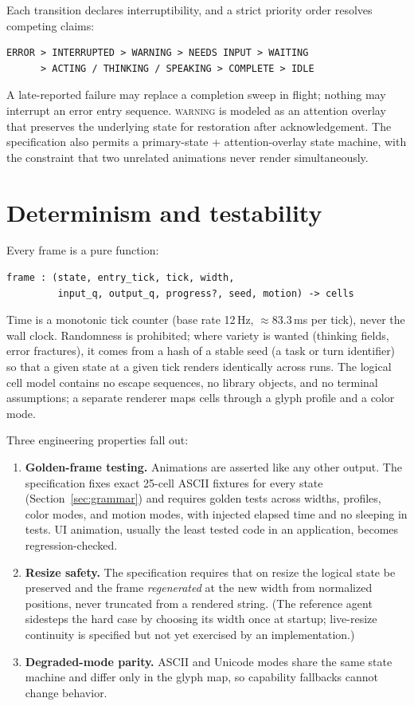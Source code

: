 \documentclass[11pt]{article}
\newcommand{\railstate}[1]{\textsc{#1}}
\begin{document}
Each transition declares interruptibility, and a strict priority order
resolves competing claims:

\begin{lstlisting}
ERROR > INTERRUPTED > WARNING > NEEDS INPUT > WAITING
      > ACTING / THINKING / SPEAKING > COMPLETE > IDLE
\end{lstlisting}

A late-reported failure may replace a completion sweep in flight; nothing
may interrupt an error entry sequence. \railstate{warning} is modeled as
an attention overlay that preserves the underlying state for restoration
after acknowledgement. The specification also permits a primary-state +
attention-overlay state machine, with the constraint that two unrelated
animations never render simultaneously.

\section{Determinism and testability}
\label{sec:determinism}

Every frame is a pure function:

\begin{lstlisting}
frame : (state, entry_tick, tick, width,
         input_q, output_q, progress?, seed, motion) -> cells
\end{lstlisting}

Time is a monotonic tick counter (base rate 12\,Hz, $\approx$83.3\,ms per
tick), never the wall clock. Randomness is prohibited; where variety is
wanted (thinking fields, error fractures), it comes from a hash of a
stable seed (a task or turn identifier) so that a given state at a given
tick renders identically across runs. The logical cell model contains no
escape sequences, no library objects, and no terminal assumptions; a
separate renderer maps cells through a glyph profile and a color mode.

Three engineering properties fall out:

\begin{enumerate}
\item \textbf{Golden-frame testing.} Animations are asserted like any
other output. The specification fixes exact 25-cell ASCII fixtures for
every state (Section~\ref{sec:grammar}) and requires golden tests across
widths, profiles, color modes, and motion modes, with injected elapsed
time and no sleeping in tests. UI animation, usually the least tested code in an application, becomes regression-checked.
\item \textbf{Resize safety.} The specification requires that on resize
the logical state be preserved and the frame \emph{regenerated} at the
new width from normalized positions, never truncated from a rendered
string. (The reference agent sidesteps the hard case by choosing its
width once at startup; live-resize continuity is specified but not yet
exercised by an implementation.)
\item \textbf{Degraded-mode parity.} ASCII and Unicode modes share the
same state machine and differ only in the glyph map, so capability
fallbacks cannot change behavior.
\end{enumerate}
\end{document}
